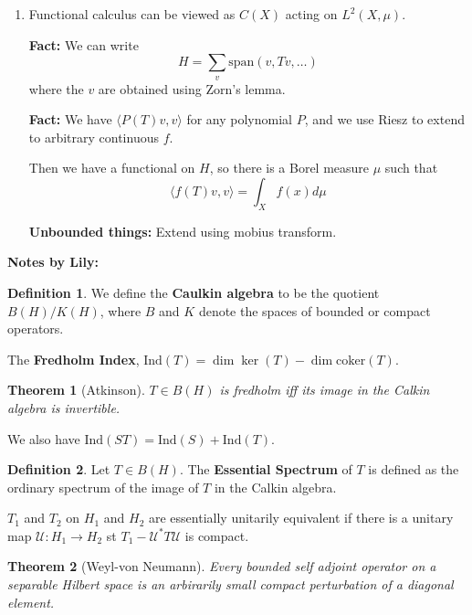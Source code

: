 \documentclass[11pt, reqno]{article}
\theoremstyle{plain}
\newtheorem*{theorem}{Theorem}
\theoremstyle{definition}
\newtheorem*{definition}{Definition}
\theoremstyle{remark}
\begin{document}
\begin{enumerate}
    \item[1.] Functional calculus can be viewed as $C(X)$ acting on $L^2(X, \mu)$.
    
    \textbf{Fact:} We can write 
    \[
        H = \sum_{v} \text{span}(v, Tv, \dots)
    \]
    where the $v$ are obtained using Zorn's lemma. 

    \textbf{Fact:} We have $\langle P(T) v, v\rangle$ for any polynomial $P$, 
    and we use Riesz to extend to arbitrary continuous $f$.

    Then we have a functional on $H$, so there is a Borel measure $\mu$ such that 
    \[
        \langle f(T)v, v\rangle = \int_X f(x) d\mu
    \]

    \textbf{Unbounded things:} Extend using mobius transform. 
\end{enumerate}

\textbf{Notes by Lily:}

\begin{definition}
    We define the \textbf{Caulkin algebra} to be the quotient $B(H)/K(H)$, where 
    $B$ and $K$ denote the spaces of bounded or compact operators.

    The \textbf{Fredholm Index}, $\text{Ind}(T) = \dim \ker(T) - \dim \text{coker}(T)$.
\end{definition}

\begin{theorem}[Atkinson]
    $T \in B(H)$ is fredholm iff its image in the Calkin algebra is invertible. 
\end{theorem}

We also have $\text{Ind}(ST) = \text{Ind}(S) + \text{Ind}(T)$.

\begin{definition}
    Let $T \in B(H)$. The \textbf{Essential Spectrum} of $T$ is defined as the ordinary
    spectrum of the image of $T$ in the Calkin algebra. 

    $T_1$ and $T_2$ on $H_1$ and $H_2$ are essentially unitarily equivalent if 
    there is a unitary map $\mathcal{U}: H_1 \to H_2$ st $T_1 - \mathcal{U}^* T \mathcal{U}$ 
    is compact. 
\end{definition}

\begin{theorem}[Weyl-von Neumann]
    Every bounded self adjoint operator on a separable Hilbert space is an 
    arbirarily small compact perturbation of a diagonal element.
\end{theorem}
\end{document}
